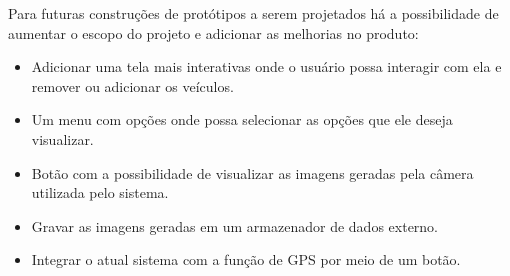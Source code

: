 Para futuras construções de protótipos a serem projetados há a possibilidade de aumentar o escopo do projeto e adicionar as melhorias no produto:

\begin{itemize}
	\item Adicionar uma tela mais interativas onde o usuário possa interagir com ela e remover ou adicionar os veículos.
	\item Um menu com opções onde possa selecionar as opções que ele deseja visualizar.
	\item Botão com a possibilidade de visualizar as imagens geradas pela câmera utilizada pelo sistema.
	\item Gravar as imagens geradas em um armazenador de dados externo.
	\item Integrar o atual sistema com a função de GPS por meio de um botão.
\end{itemize}